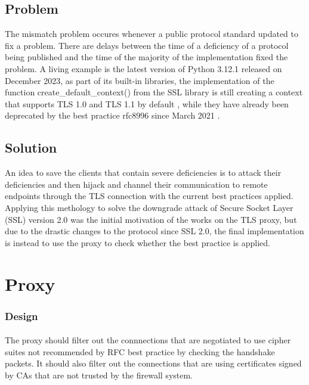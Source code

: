 \documentclass[mscthesis]{usiinfthesis}
\begin{document}
\subsection{Problem}
The mismatch problem occures whenever a public protocol standard updated to fix a problem. There are delays between the time of a deficiency of a protocol being published and the time of the majority of the implementation fixed the problem. A living example is the latest version of Python 3.12.1 released on December 2023, as part of its built-in libraries, the implementation of the function create\_default\_context() from the SSL library is still creating a context that supports TLS 1.0 and TLS 1.1 by default \citep{pyton:ssl}, while they have already been deprecated by the best practice rfc8996 since March 2021 \citep{rfc:notls11}.

\subsection{Solution}
An idea to save the clients that contain severe deficiencies is to attack their deficiencies and then hijack and channel their communication to remote endpoints through the TLS connection with the current best practices applied. Applying this methology to solve the downgrade attack of Secure Socket Layer (SSL) version 2.0 was the initial motivation of the works on the TLS proxy, but due to the drastic changes to the protocol since SSL 2.0, the final implementation is instead to use the proxy to check whether the best practice is applied.


\section{Proxy}
\subsubsection{Design}
\paragraph{}
The proxy should filter out the connnections that are negotiated to use cipher suites not recommended by RFC best practice by checking the handshake packets. It should also filter out the connections that are using certificates signed by CAs that are not trusted by the firewall system.
\end{document}
